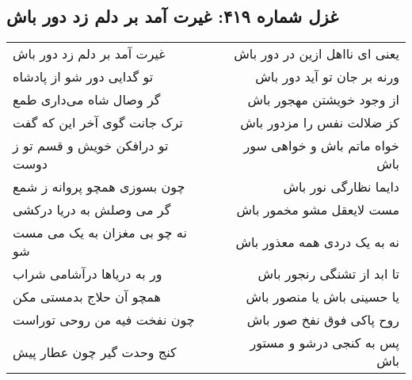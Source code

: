 \begin{center}
\section*{غزل شماره ۴۱۹: غیرت آمد بر دلم زد دور باش}
\label{sec:419}
\begin{longtable}{l p{0.5cm} r}
غیرت آمد بر دلم زد دور باش
&&
یعنی ای نااهل ازین در دور باش
\\
تو گدایی دور شو از پادشاه
&&
ورنه بر جان تو آید دور باش
\\
گر وصال شاه می‌داری طمع
&&
از وجود خویشتن مهجور باش
\\
ترک جانت گوی آخر این که گفت
&&
کز ضلالت نفس را مزدور باش
\\
تو درافکن خویش و قسم تو ز دوست
&&
خواه ماتم باش و خواهی سور باش
\\
چون بسوزی همچو پروانه ز شمع
&&
دایما نظارگی نور باش
\\
گر می وصلش به دریا درکشی
&&
مست لایعقل مشو مخمور باش
\\
نه چو بی مغزان به یک می مست شو
&&
نه به یک دردی همه معذور باش
\\
ور به دریاها درآشامی شراب
&&
تا ابد از تشنگی رنجور باش
\\
همچو آن حلاج بدمستی مکن
&&
یا حسینی باش یا منصور باش
\\
چون نفخت فیه من روحی توراست
&&
روح پاکی فوق نفخ صور باش
\\
کنج وحدت گیر چون عطار پیش
&&
پس به کنجی درشو و مستور باش
\\
\end{longtable}
\end{center}
